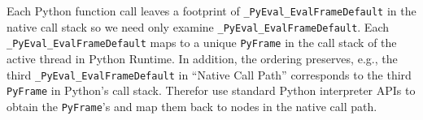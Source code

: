  
  Each Python function call leaves a footprint of {\tt \_PyEval\_EvalFrameDefault} in the native call stack so we need only examine 
 {\tt \_PyEval\_EvalFrameDefault}. Each {\tt \_PyEval\_EvalFrameDefault} maps to a unique {\tt PyFrame} in the call stack of the active thread in Python Runtime. In addition, the ordering preserves, e.g., the third {\tt \_PyEval\_EvalFrameDefault} in ``Native Call Path'' corresponds to the third {\tt PyFrame} in Python's call stack. Therefor use standard Python interpreter APIs to obtain the {\tt PyFrame}'s and map them back to nodes in the native call path. 





